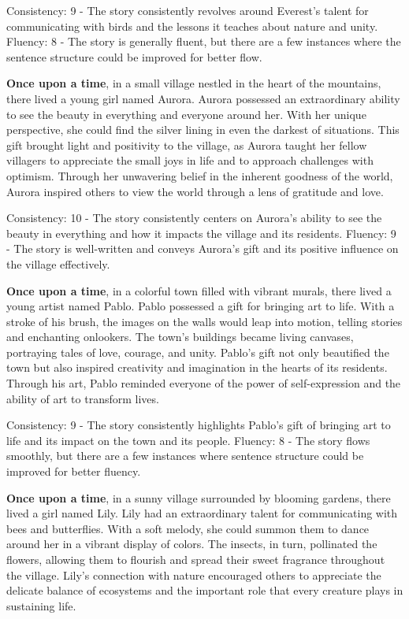 \documentclass{article}
\begin{document}
Consistency: 9 - The story consistently revolves around Everest's talent for communicating with birds and the lessons it teaches about nature and unity.
Fluency: 8 - The story is generally fluent, but there are a few instances where the sentence structure could be improved for better flow.

\textbf{Once upon a time}, in a small village nestled in the heart of the mountains, there lived a young girl named Aurora. Aurora possessed an extraordinary ability to see the beauty in everything and everyone around her. With her unique perspective, she could find the silver lining in even the darkest of situations. This gift brought light and positivity to the village, as Aurora taught her fellow villagers to appreciate the small joys in life and to approach challenges with optimism. Through her unwavering belief in the inherent goodness of the world, Aurora inspired others to view the world through a lens of gratitude and love.

Consistency: 10 - The story consistently centers on Aurora's ability to see the beauty in everything and how it impacts the village and its residents.
Fluency: 9 - The story is well-written and conveys Aurora's gift and its positive influence on the village effectively.

\textbf{Once upon a time}, in a colorful town filled with vibrant murals, there lived a young artist named Pablo. Pablo possessed a gift for bringing art to life. With a stroke of his brush, the images on the walls would leap into motion, telling stories and enchanting onlookers. The town's buildings became living canvases, portraying tales of love, courage, and unity. Pablo's gift not only beautified the town but also inspired creativity and imagination in the hearts of its residents. Through his art, Pablo reminded everyone of the power of self-expression and the ability of art to transform lives.

Consistency: 9 - The story consistently highlights Pablo's gift of bringing art to life and its impact on the town and its people.
Fluency: 8 - The story flows smoothly, but there are a few instances where sentence structure could be improved for better fluency.

\textbf{Once upon a time}, in a sunny village surrounded by blooming gardens, there lived a girl named Lily. Lily had an extraordinary talent for communicating with bees and butterflies. With a soft melody, she could summon them to dance around her in a vibrant display of colors. The insects, in turn, pollinated the flowers, allowing them to flourish and spread their sweet fragrance throughout the village. Lily's connection with nature encouraged others to appreciate the delicate balance of ecosystems and the important role that every creature plays in sustaining life.
\end{document}
